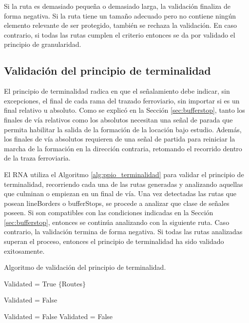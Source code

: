 		Si la ruta es demasiado pequeña o demasiado larga, la validación finaliza de forma negativa. Si la ruta tiene un tamaño adecuado pero no contiene ningún elemento relevante de ser protegido, también se rechaza la validación. En caso contrario, si todas las rutas cumplen el criterio entonces se da por validado el principio de granularidad.
		
	\subsection{Validación del principio de terminalidad}
		
		El principio de terminalidad radica en que el señalamiento debe indicar, sin excepciones, el final de cada rama del trazado ferroviario, sin importar si es un final relativo u absoluto. Como se explicó en la Sección \ref{sec:bufferstop}, tanto los finales de vía relativos como los absolutos necesitan una señal de parada que permita habilitar la salida de la formación de la locación bajo estudio. Además, los finales de vía absolutos requieren de una señal de partida para reiniciar la marcha de la formación en la dirección contraria, retomando el recorrido dentro de la traza ferroviaria.	
		
		El RNA utiliza el Algoritmo \ref{alg:ppio_terminalidad} para validar el principio de terminalidad, recorriendo cada una de las rutas generadas y analizando aquellas que culminan o empiezan en un final de vía. Una vez detectadas las rutas que posean lineBorders o bufferStops, se procede a analizar que clase de señales poseen. Si son compatibles con las condiciones indicadas en la Sección \ref{sec:bufferstop}, entonces se continúa analizando con la siguiente ruta. Caso contrario, la validación termina de forma negativa. Si todas las rutas analizadas superan el proceso, entonces el principio de terminalidad ha sido validado exitosamente.
		
		\begin{algorithm}[hbt!]
			\caption{Algoritmo de validación del principio de terminalidad.}\label{alg:ppio_terminalidad}
			\DontPrintSemicolon
			\SetNoFillComment
			\LinesNotNumbered 
			Validated = True\;
			$\{$Routes$\}$\; 
			{
				{
					{
						Validated = False\;
					}
				}
				
				{
					{
						Validated = False\;
					}
					{
						Validated = False\;
					}
				}
			}
			
		\end{algorithm}
		
